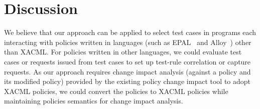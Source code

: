 \section{Discussion}\label{sec:discussion}
We believe that our approach can be applied to select
test cases in programs each interacting
with policies written in languages (such as EPAL~\cite{epal} and Alloy~\cite{jackson01:micromodularity}) other than XACML.
For policies written in other languages, we could evaluate test cases or requests issued from test cases
to set up test-rule correlation or capture requests. 
As our approach requires change impact analysis (against a policy and
its modified policy) provided by the existing policy change impact tool to adopt
XACML policies, we could convert the policies to XACML policies
while maintaining policies semantics for change impact analysis.








